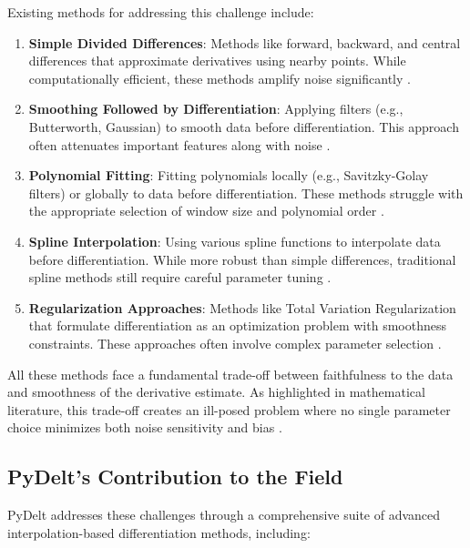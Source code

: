 \documentclass[10pt,journal,compsoc]{IEEEtran}
\begin{document}
Existing methods for addressing this challenge include:

\begin{enumerate}
    \item \textbf{Simple Divided Differences}: Methods like forward, backward, and central differences that approximate derivatives using nearby points. While computationally efficient, these methods amplify noise significantly \cite{kaw2021numerical}.
    
    \item \textbf{Smoothing Followed by Differentiation}: Applying filters (e.g., Butterworth, Gaussian) to smooth data before differentiation. This approach often attenuates important features along with noise \cite{ahnert2007numerical}.
    
    \item \textbf{Polynomial Fitting}: Fitting polynomials locally (e.g., Savitzky-Golay filters) or globally to data before differentiation. These methods struggle with the appropriate selection of window size and polynomial order \cite{savitzky1964smoothing}.
    
    \item \textbf{Spline Interpolation}: Using various spline functions to interpolate data before differentiation. While more robust than simple differences, traditional spline methods still require careful parameter tuning \cite{ramsay2005functional}.
    
    \item \textbf{Regularization Approaches}: Methods like Total Variation Regularization that formulate differentiation as an optimization problem with smoothness constraints. These approaches often involve complex parameter selection \cite{chartrand2011numerical}.
\end{enumerate}

All these methods face a fundamental trade-off between faithfulness to the data and smoothness of the derivative estimate. As highlighted in mathematical literature, this trade-off creates an ill-posed problem where no single parameter choice minimizes both noise sensitivity and bias \cite{knowles1995variational}.

\subsection{PyDelt's Contribution to the Field}

PyDelt addresses these challenges through a comprehensive suite of advanced interpolation-based differentiation methods, including:
\end{document}
